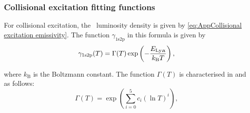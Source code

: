 \subsubsection{Collisional excitation fitting functions}

For collisional excitation, the \lya\ luminosity density is given by \cref{eq:AppCollisional excitation emissivity}. The function $\gamma_\text{1s2p}$ in this formula is given by
\begin{equation}
    \gamma_\text{1s2p} (T) = \Gamma(T) \exp \left( -\frac{E_\text{{Ly\ensuremath{\upalpha}}}}{k_\text{B}T} \right),
\end{equation}

\noindent where $k_\text{B}$ is the Boltzmann constant. The function $\Gamma(T)$ is characterised in \citet{1990MNRAS.242..692S} and \citet{1991ApJ...380..302S} as follows:
\begin{equation}
    \label{eq:Gamma}
    \Gamma (T) = \exp \left( \sum_{i=0}^{5} c_i \left( \ln T \right)^i \right),
\end{equation}

